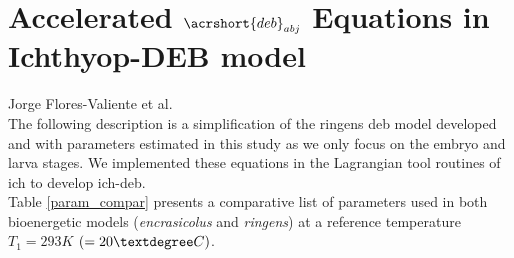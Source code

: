 \clearpage
\section{Accelerated $\acrshort{deb}_{abj}$ Equations in Ichthyop-DEB model}\label{DEBabjEqn}

Jorge Flores-Valiente et al.\\

The following description is a simplification of the \gls{ringens} \acrshort{deb} model developed and with parameters estimated in this study as we only focus on the embryo and larva stages. We implemented these equations in the Lagrangian tool routines of \gls{ich} \citep{LettVerl2008} to develop \gls{ich-deb}.\\

Table \ref{param_compar} presents a comparative list of parameters used in both bioenergetic models (\textit{\gls{encrasicolus}} and \textit{\gls{ringens}}) at a reference temperature $T_{1} =  293 K$ $\left (=20\textdegree C \right )$.\\

